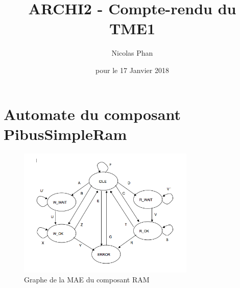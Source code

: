 \documentclass{article}
\title{ARCHI2 - Compte-rendu du TME1}
\author{Nicolas Phan}
\date{pour le 17 Janvier 2018}
\begin{document}
\pagestyle{headings}
\maketitle
\tableofcontents
\newpage



\section{Automate du composant PibusSimpleRam}

\begin{figure}[H]
\includegraphics[width=0.75\textwidth]{pics/mae_ram.png}
\centering
\caption{Graphe de la MAE du composant RAM}
\label{mae_ram}
\end{figure}
\end{document}
